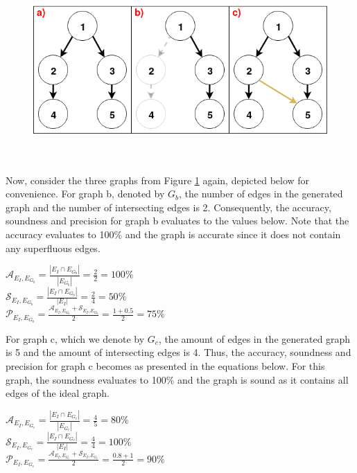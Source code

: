 \documentclass{kththesis}
\begin{document}
\begin{figure}[ht]
    \centering
    \includegraphics[scale=0.6]{Images/SoundAccurateGraph.png}
    \label{fig:SoundAccurateGraph}
\end{figure}
\\ \\
Now, consider the three graphs from Figure \ref{fig:SoundAccurateGraph} again, depicted below for convenience. For graph b, denoted by $G_b$, the number of edges in the generated graph and the number of intersecting edges is 2. Consequently, the accuracy, soundness and precision for graph b evaluates to the values below. Note that the accuracy evaluates to 100\% and the graph is accurate since it does not contain any superfluous edges. 
\begin{center}
$\mathcal{A}_{E_I,E_{G_b}} = \frac{|E_I \cap E_{G_b}|}{|E_{G_b}|}=\frac{2}{2}=100\%$\\ $\mathcal{S}_{E_I,E_{G_b}} = \frac{|E_I \cap E_{G_b}|}{|E_I|}=\frac{2}{4}=50\%$\\
$ \mathcal{P}_{E_I,E_{G_b}} = \frac{\mathcal{A}_{E_I,E_{G_b}}+\mathcal{S}_{E_I,E_{G_b}}}{2}=\frac{1+0.5}{2}=75\%$\\
\end{center}
For graph c, which we denote by $G_c$, the amount of edges in the generated graph is 5 and the amount of intersecting edges is 4. Thus, the accuracy, soundness and precision for graph c becomes as presented in the equations below. For this graph, the soundness evaluates to 100\% and the graph is sound as it contains all edges of the ideal graph. 
\begin{center}
$\mathcal{A}_{E_I,E_{G_c}} = \frac{|E_I \cap E_{G_c}|}{|E_{G_c}|}=\frac{4}{5}=80\%$\\ $\mathcal{S}_{E_I,E_{G_c}} = \frac{|E_I \cap E_{G_c}|}{|E_I|}=\frac{4}{4}=100\%$\\
$ \mathcal{P}_{E_I,E_{G_c}} = \frac{\mathcal{A}_{E_I,E_{G_c}}+\mathcal{S}_{E_I,E_{G_c}}}{2}=\frac{0.8+1}{2}=90\%$\\
\end{center}
\end{document}
